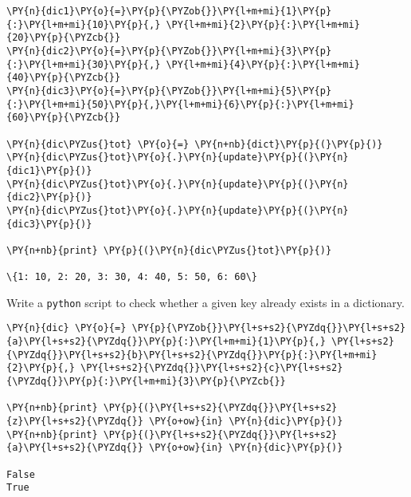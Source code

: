 \begin{Answer}
\begin{tcolorbox}[size=fbox, boxrule=1pt, colback=cellbackground, colframe=cellborder]
\begin{Verbatim}[commandchars=\\\{\}]
\PY{n}{dic1}\PY{o}{=}\PY{p}{\PYZob{}}\PY{l+m+mi}{1}\PY{p}{:}\PY{l+m+mi}{10}\PY{p}{,} \PY{l+m+mi}{2}\PY{p}{:}\PY{l+m+mi}{20}\PY{p}{\PYZcb{}}
\PY{n}{dic2}\PY{o}{=}\PY{p}{\PYZob{}}\PY{l+m+mi}{3}\PY{p}{:}\PY{l+m+mi}{30}\PY{p}{,} \PY{l+m+mi}{4}\PY{p}{:}\PY{l+m+mi}{40}\PY{p}{\PYZcb{}}
\PY{n}{dic3}\PY{o}{=}\PY{p}{\PYZob{}}\PY{l+m+mi}{5}\PY{p}{:}\PY{l+m+mi}{50}\PY{p}{,}\PY{l+m+mi}{6}\PY{p}{:}\PY{l+m+mi}{60}\PY{p}{\PYZcb{}}

\PY{n}{dic\PYZus{}tot} \PY{o}{=} \PY{n+nb}{dict}\PY{p}{(}\PY{p}{)}
\PY{n}{dic\PYZus{}tot}\PY{o}{.}\PY{n}{update}\PY{p}{(}\PY{n}{dic1}\PY{p}{)}
\PY{n}{dic\PYZus{}tot}\PY{o}{.}\PY{n}{update}\PY{p}{(}\PY{n}{dic2}\PY{p}{)}
\PY{n}{dic\PYZus{}tot}\PY{o}{.}\PY{n}{update}\PY{p}{(}\PY{n}{dic3}\PY{p}{)}

\PY{n+nb}{print} \PY{p}{(}\PY{n}{dic\PYZus{}tot}\PY{p}{)}

\{1: 10, 2: 20, 3: 30, 4: 40, 5: 50, 6: 60\}
\end{Verbatim}
\end{tcolorbox}
\end{Answer}

\begin{Exercise}
Write a \texttt{python} script to check whether a given key already exists in a dictionary.
\end{Exercise}

\begin{Answer}
\begin{tcolorbox}[size=fbox, boxrule=1pt, colback=cellbackground, colframe=cellborder]
\begin{Verbatim}[commandchars=\\\{\}]
\PY{n}{dic} \PY{o}{=} \PY{p}{\PYZob{}}\PY{l+s+s2}{\PYZdq{}}\PY{l+s+s2}{a}\PY{l+s+s2}{\PYZdq{}}\PY{p}{:}\PY{l+m+mi}{1}\PY{p}{,} \PY{l+s+s2}{\PYZdq{}}\PY{l+s+s2}{b}\PY{l+s+s2}{\PYZdq{}}\PY{p}{:}\PY{l+m+mi}{2}\PY{p}{,} \PY{l+s+s2}{\PYZdq{}}\PY{l+s+s2}{c}\PY{l+s+s2}{\PYZdq{}}\PY{p}{:}\PY{l+m+mi}{3}\PY{p}{\PYZcb{}}

\PY{n+nb}{print} \PY{p}{(}\PY{l+s+s2}{\PYZdq{}}\PY{l+s+s2}{z}\PY{l+s+s2}{\PYZdq{}} \PY{o+ow}{in} \PY{n}{dic}\PY{p}{)}
\PY{n+nb}{print} \PY{p}{(}\PY{l+s+s2}{\PYZdq{}}\PY{l+s+s2}{a}\PY{l+s+s2}{\PYZdq{}} \PY{o+ow}{in} \PY{n}{dic}\PY{p}{)}

False
True
\end{Verbatim}
\end{tcolorbox}
\end{Answer}

